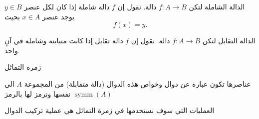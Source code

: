 \begin{definition}{الدالة الشاملة}{}
	لتكن $f: A \to B$ دالة. نقول إن $f$ دالة شاملة إذا كان لكل عنصر $y \in B$ يوجد عنصر $x \in A$ بحيث
	\[
	f(x) = y.
	\]
\end{definition}

\begin{definition}{الدالة التقابل}{}
	لتكن $f: A \to B$ دالة. نقول إن $f$ دالة تقابل إذا كانت متباينة وشاملة في آنٍ واحد.
\end{definition}

\begin{definition}{زمرة التماثل}{}
عناصرها تكون عبارة عن دوال وخواص هذه الدوال (دالة متقابلة) من المجموعة $A$ الى نفسها ونرمز لها بالرمز 
$\operatorname{symm}(A)$

العمليات التي سوف نستخدمها في زمرة التماثل هي عملية تركيب الدوال
\end{definition} 

